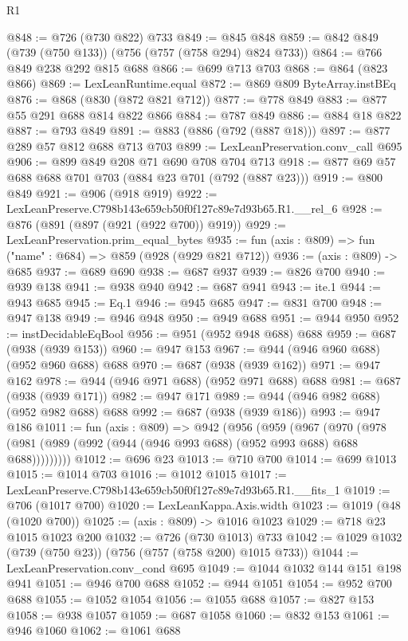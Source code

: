 \begin{lexlean}{R1}
\begin{coremodule}
@848 := @726 (@730 @822) @733
@849 := @845 @848
@859 := @842 @849 (@739 (@750 @133)) (@756 (@757 (@758 @294) @824 @733))
@864 := @766 @849 @238 @292 @815 @688
@866 := @699 @713 @703
@868 := @864 (@823 @866)
@869 := LexLeanRuntime.equal
@872 := @869 @809 ByteArray.instBEq
@876 := @868 (@830 (@872 @821 @712))
@877 := @778 @849
@883 := @877 @55 @291 @688 @814 @822 @866
@884 := @787 @849
@886 := @884 @18 @822
@887 := @793 @849
@891 := @883 (@886 (@792 (@887 @18)))
@897 := @877 @289 @57 @812 @688 @713 @703
@899 := LexLeanPreservation.conv_call @695
@906 := @899 @849 @208 @71 @690 @708 @704 @713
@918 := @877 @69 @57 @688 @688 @701 @703 (@884 @23 @701 (@792 (@887 @23)))
@919 := @800 @849
@921 := @906 (@918 @919)
@922 := LexLeanPreserve.C798b143e659cb50f0f127c89e7d93b65.R1.__rel_6
@928 := @876 (@891 (@897 (@921 (@922 @700)) @919))
@929 := LexLeanPreservation.prim_equal_bytes
@935 := fun (axis : @809) => fun ("name" : @684) => @859 (@928 (@929 @821 @712))
@936 := (axis : @809) -> @685
@937 := @689 @690
@938 := @687 @937
@939 := @826 @700
@940 := @939 @138
@941 := @938 @940
@942 := @687 @941
@943 := ite.{1}
@944 := @943 @685
@945 := Eq.{1}
@946 := @945 @685
@947 := @831 @700
@948 := @947 @138
@949 := @946 @948
@950 := @949 @688
@951 := @944 @950
@952 := instDecidableEqBool
@956 := @951 (@952 @948 @688) @688
@959 := @687 (@938 (@939 @153))
@960 := @947 @153
@967 := @944 (@946 @960 @688) (@952 @960 @688) @688
@970 := @687 (@938 (@939 @162))
@971 := @947 @162
@978 := @944 (@946 @971 @688) (@952 @971 @688) @688
@981 := @687 (@938 (@939 @171))
@982 := @947 @171
@989 := @944 (@946 @982 @688) (@952 @982 @688) @688
@992 := @687 (@938 (@939 @186))
@993 := @947 @186
@1011 := fun (axis : @809) =>
  @942
    (@956
      (@959
        (@967
          (@970 (@978 (@981 (@989 (@992 (@944 (@946 @993 @688) (@952 @993 @688) @688 @688)))))))))
@1012 := @696 @23
@1013 := @710 @700
@1014 := @699 @1013
@1015 := @1014 @703
@1016 := @1012 @1015
@1017 := LexLeanPreserve.C798b143e659cb50f0f127c89e7d93b65.R1.__fits_1
@1019 := @706 (@1017 @700)
@1020 := LexLeanKappa.Axis.width
@1023 := @1019 (@48 (@1020 @700))
@1025 := (axis : @809) -> @1016 @1023
@1029 := @718 @23 @1015 @1023 @200
@1032 := @726 (@730 @1013) @733
@1042 := @1029 @1032 (@739 (@750 @23)) (@756 (@757 (@758 @200) @1015 @733))
@1044 := LexLeanPreservation.conv_cond @695
@1049 := @1044 @1032 @144 @151 @198 @941
@1051 := @946 @700 @688
@1052 := @944 @1051
@1054 := @952 @700 @688
@1055 := @1052 @1054
@1056 := @1055 @688
@1057 := @827 @153
@1058 := @938 @1057
@1059 := @687 @1058
@1060 := @832 @153
@1061 := @946 @1060
@1062 := @1061 @688

\end{coremodule}
\end{lexlean}
